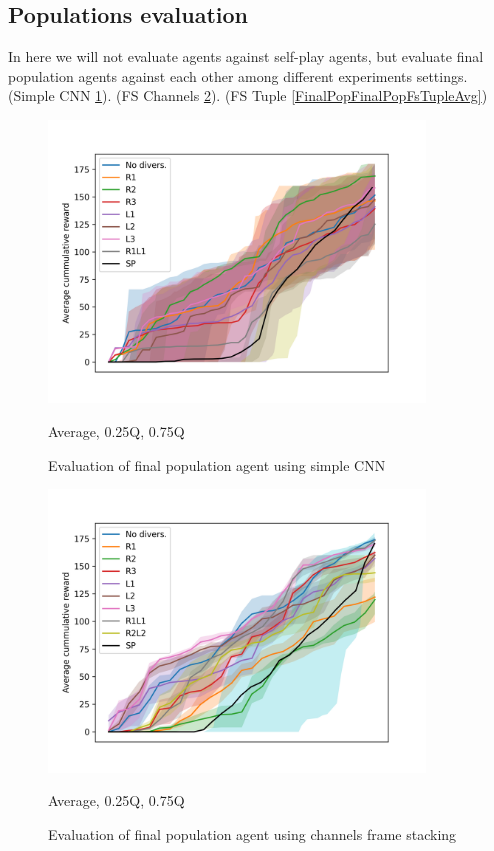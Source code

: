 \subsection{Populations evaluation}
In here we will not evaluate agents against self-play agents, but evaluate final population agents against each other among different experiments settings.
(Simple CNN \ref{FinalPopFinalPopSimpleCnnAvg}). (FS Channels \ref{FinalPopFinalPopFsChannelsAvg}). (FS Tuple \ref{FinalPopFinalPopFsTupleAvg})
\begin{figure}[!ht]
    \centering
    \includegraphics*[width=10cm]{../img/FinalPopFinalPopSimpleCnnAvg.png}

    \caption{Evaluation of final population agent using simple CNN}
    \label{FinalPopFinalPopSimpleCnnAvg}
    \medskip
    \small 

    Average, 0.25Q, 0.75Q

\end{figure}

\begin{figure}[!ht]
    \centering
    \includegraphics*[width=10cm]{../img/FinalPopFinalPopFsChannelsAvg.png}

    \caption{Evaluation of final population agent using channels frame stacking}
    \label{FinalPopFinalPopFsChannelsAvg}
    \medskip
    \small 

    Average, 0.25Q, 0.75Q

\end{figure}


